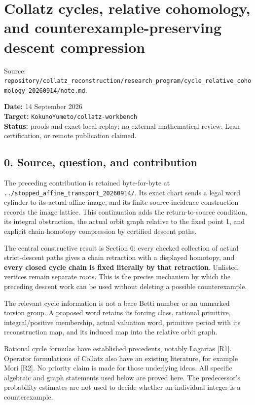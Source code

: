 \chapter{Collatz cycles, relative cohomology, and
counterexample-preserving descent compression}
{\small\sffamily Source: \nolinkurl{repository/collatz_reconstruction/research_program/cycle_relative_cohomology_20260914/note.md}.\par}


\textbf{Date:} 14 September 2026\\
\textbf{Target:} \nolinkurl{KokunoYumeto/collatz-workbench}\\
\textbf{Status:} proofs and exact local replay; no external mathematical
review, Lean certification, or remote publication claimed.

\section{0. Source, question, and contribution}

The preceding contribution is retained byte-for-byte at
\nolinkurl{../stopped_affine_transport_20260914/}. Its exact chart sends
a legal word cylinder to its actual affine image, and its finite
source-incidence construction records the image lattice. This
continuation adds the return-to-source condition, its integral
obstruction, the actual orbit graph relative to the fixed point 1, and
explicit chain-homotopy compression by certified descent paths.

The central constructive result is Section 6: every checked collection
of actual strict-descent paths gives a chain retraction with a displayed
homotopy, and \textbf{every closed cycle chain is fixed literally by
that retraction}. Unlisted vertices remain separate roots. This is the
precise mechanism by which the preceding descent work can be used
without deleting a possible counterexample.

The relevant cycle information is not a bare Betti number or an unmarked
torsion group. A proposed word retains its forcing class, rational
primitive, integral/positive membership, actual valuation word,
primitive period with its reconstruction map, and its induced map into
the relative orbit graph.

Rational cycle formulas have established precedents, notably Lagarias
{[}R1{]}. Operator formulations of Collatz also have an existing
literature, for example Mori {[}R2{]}. No priority claim is made for
those underlying ideas. All specific algebraic and graph statements used
below are proved here. The predecessor's probability estimates are not
used to decide whether an individual integer is a counterexample.


